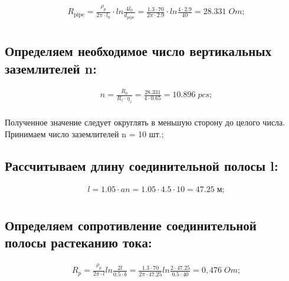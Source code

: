 \begin{equation}
    \begin{split}	
        &R_\text{pipe}=\frac{\rho_p}{2\pi \cdot l_0}\cdot ln \frac{4 l_0}{d_{pipe}} = \frac{1.3 \cdot 70}{2\pi \cdot 2.9}\cdot ln \frac{4 \cdot 2.9}{40} = 28.331\; Om;\\
    \end{split}
\end{equation}

\subsection{Определяем необходимое число вертикальных заземлителей n:}

\begin{equation}
    \begin{split}	
        &n=\frac{R_0}{R_{z} \cdot \eta_{z}} = \frac{28.331}{4 \cdot 0.65} = 10.896\; pcs;\\
    \end{split}
\end{equation}

Полученное значение следует округлять в меньшую сторону до целого числа. Принимаем число заземлителей n = 10 шт.;

\subsection{Рассчитываем длину соединительной полосы l:}

\begin{equation}
    \begin{split}	
        &l = 1.05\cdot an = 1.05\cdot 4.5\cdot 10 = 47.25\; м;\\
    \end{split}
\end{equation}

\subsection{Определяем сопротивление соединительной полосы растеканию тока:}

\begin{equation}
    \begin{split}	
        &R_{p} = \frac{\rho_p}{2 \pi \cdot l} ln \frac{2 l }{0.5 \cdot b} =\frac{1.3 \cdot 70}{2 \pi \cdot 47.25} ln \frac{2\cdot 47.25 }{0.5 \cdot 40} = 0,476\; Om;\\
    \end{split}
\end{equation}


